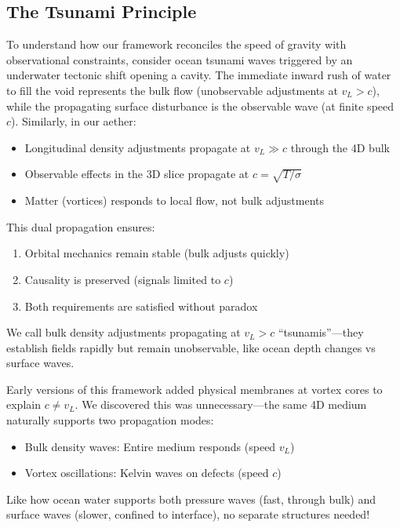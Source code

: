 \subsection{The Tsunami Principle}

To understand how our framework reconciles the speed of gravity with observational constraints, consider ocean tsunami waves triggered by an underwater tectonic shift opening a cavity. The immediate inward rush of water to fill the void represents the bulk flow (unobservable adjustments at $v_L > c$), while the propagating surface disturbance is the observable wave (at finite speed $c$). Similarly, in our aether:
\begin{itemize}
\item Longitudinal density adjustments propagate at $v_L \gg c$ through the 4D bulk
\item Observable effects in the 3D slice propagate at $c = \sqrt{T / \sigma}$
\item Matter (vortices) responds to local flow, not bulk adjustments
\end{itemize}

This dual propagation ensures:
\begin{enumerate}
\item Orbital mechanics remain stable (bulk adjusts quickly)
\item Causality is preserved (signals limited to $c$)
\item Both requirements are satisfied without paradox
\end{enumerate}

We call bulk density adjustments propagating at $v_L > c$ ``tsunamis''---they establish fields rapidly but remain unobservable, like ocean depth changes vs surface waves.

\begin{tcolorbox}[title=Why Two Speeds Without Membranes]
Early versions of this framework added physical membranes at vortex cores
to explain $c \neq v_L$. We discovered this was unnecessary---the same 4D medium
naturally supports two propagation modes:

\begin{itemize}
\item Bulk density waves: Entire medium responds (speed $v_L$)
\item Vortex oscillations: Kelvin waves on defects (speed $c$)
\end{itemize}

Like how ocean water supports both pressure waves (fast, through bulk)
and surface waves (slower, confined to interface), no separate structures
needed!
\end{tcolorbox}

